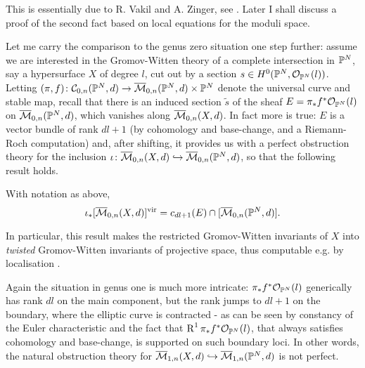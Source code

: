 This is essentially due to R. Vakil and A. Zinger, see \cite[Lemma~5.9]{Vre} \cite[\S 1.2]{VZ}. Later I shall discuss a proof of the second fact based on local equations for the moduli space.

Let me carry the comparison to the genus zero situation one step further: assume we are interested in the Gromov-Witten theory of a complete intersection in $\mathbb P^N$, say a hypersurface $X$ of degree $l$, cut out by a section $s\in H^0(\mathbb P^N,\mathcal{O}_{\mathbb P^N}(l))$. Letting $(\pi,f)\colon \mathcal C_{0,n}(\mathbb P^N,d) \rightarrow \overline{\mathcal{M}}_{0,n}(\mathbb P^N,d)\times \mathbb P^N$ denote the universal curve and stable map, recall that there is an induced section $\tilde{s}$ of the sheaf $E=\pi_*f^*\mathcal{O}_{\mathbb P^N}(l)$ on $\overline{\mathcal{M}}_{0,n}(\mathbb P^N,d)$, which vanishes along $\overline{\mathcal{M}}_{0,n}(X,d)$. In fact more is true: $E$ is a vector bundle of rank $dl+1$ (by cohomology and base-change, and a Riemann-Roch computation) and, after shifting, it provides us with a perfect obstruction theory for the inclusion $\iota\colon \overline{\mathcal{M}}_{0,n}(X,d)\hookrightarrow\overline{\mathcal{M}}_{0,n}(\mathbb P^N,d)$, so that the following result holds.

\begin{prop}\cite{CKL,KKP}
 With notation as above,
 \[\iota_*[\overline{\mathcal{M}}_{0,n}(X,d)]^{\mathrm{vir}}=c_{dl+1}(E)\cap [\overline{\mathcal{M}}_{0,n}(\mathbb P^N,d)].\]
\end{prop}
In particular, this result makes the restricted Gromov-Witten invariants of $X$ into \emph{twisted} Gromov-Witten invariants of projective space, thus computable e.g. by localisation \cite{Kon}.

Again the situation in genus one is much more intricate: $\pi_*f^*\mathcal{O}_{\mathbb P^N}(l)$ generically has rank $dl$ on the main component, but the rank jumps to $dl+1$ on the boundary, where the elliptic curve is contracted - as can be seen by constancy of the Euler characteristic and the fact that $\operatorname{R}^1\pi_*f^*\mathcal{O}_{\mathbb P^N}(l)$, that always satisfies cohomology and base-change, is supported on such boundary loci. In other words, the natural obstruction theory for $\overline{\mathcal{M}}_{1,n}(X,d)\hookrightarrow\overline{\mathcal{M}}_{1,n}(\mathbb P^N,d)$ is not perfect.

